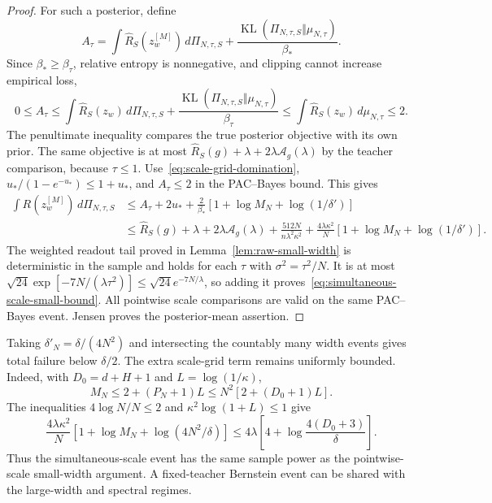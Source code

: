 \begin{proof}
For such a posterior, define
\[
 A_\tau=\int\widehat R_S(z_w^{[M]})\,d\Pi_{N,\tau,S}
      +\frac{\operatorname{KL}(\Pi_{N,\tau,S}\Vert\mu_{N,\tau})}
                   {\beta_*}.
\]
Since $\beta_*\geq\beta_\tau$, relative entropy is nonnegative, and
clipping cannot increase empirical loss,
\[
 0\leq A_\tau
 \leq\int\widehat R_S(z_w)\,d\Pi_{N,\tau,S}
       +\frac{\operatorname{KL}(\Pi_{N,\tau,S}\Vert\mu_{N,\tau})}
                    {\beta_\tau}
 \leq\int\widehat R_S(z_w)\,d\mu_{N,\tau}\leq2.
\]
The penultimate inequality compares the true posterior objective with
its own prior.  The same objective is at most
$\widehat R_S(g)+\lambda+2\lambda\mathcal A_g(\lambda)$ by the
teacher comparison, because $\tau\leq1$.
Use~\eqref{eq:scale-grid-domination},
$u_* /(1-e^{-u_*})\leq1+u_*$, and $A_\tau\leq2$ in the PAC--Bayes
bound.  This gives
\begin{align*}
 \int R(z_w^{[M]})\,d\Pi_{N,\tau,S}
 &\leq A_\tau+2u_*
        +\frac{2}{\beta_*}[1+\log M_N+\log(1/\delta')]\\
 &\leq\widehat R_S(g)+\lambda+2\lambda\mathcal A_g(\lambda)
       +\frac{512N}{n\lambda^2\kappa^2}
       +\frac{4\lambda\kappa^2}{N}
                       [1+\log M_N+\log(1/\delta')].
\end{align*}
The weighted readout tail proved in Lemma~\ref{lem:raw-small-width}
is deterministic in the sample and holds for each $\tau$ with
$\sigma^2=\tau^2/N$.  It is at most
$\sqrt{24}\exp[-7N/(\lambda\tau^2)]\leq\sqrt{24}e^{-7N/\lambda}$,
so adding it proves~\eqref{eq:simultaneous-scale-small-bound}.
All pointwise scale comparisons are valid on the same PAC--Bayes
event.  Jensen proves the posterior-mean assertion.
\end{proof}

Taking $\delta'_N=\delta/(4N^2)$ and intersecting the countably many
width events gives total failure below $\delta/2$.
The extra scale-grid term remains uniformly bounded.  Indeed, with
$D_0=d+H+1$ and $L=\log(1/\kappa)$,
\[
 M_N\leq2+(P_N+1)L
       \leq N^2[2+(D_0+1)L].
\]
The inequalities $4\log N/N\leq2$ and
$\kappa^2\log(1+L)\leq1$ give
\begin{equation}
 \frac{4\lambda\kappa^2}{N}
       [1+\log M_N+\log(4N^2/\delta)]
 \leq4\lambda\left[4+\log\frac{4(D_0+3)}\delta\right].
 \label{eq:simultaneous-scale-confidence}
\end{equation}
Thus the simultaneous-scale event has the same sample power as the
pointwise-scale small-width argument.  A fixed-teacher Bernstein event
can be shared with the large-width and spectral regimes.
